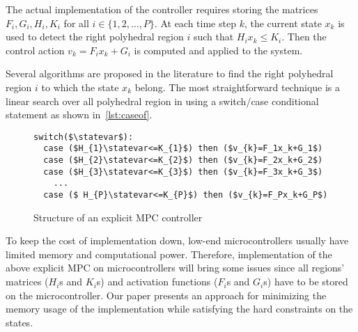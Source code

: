 The actual implementation of the controller requires storing the matrices $F_i,G_i,H_i,K_i$ for all $i\in\{1,2,\ldots,P\}$. At each time step $k$, the current state $x_k$ is used to detect the right polyhedral region $i$ such that $H_i x_k\le K_i$. Then the control action $v_k = F_i x_k + G_i$ is computed and applied to the system.

Several algorithms are proposed in the literature \cite{Mnnigmann:2011,Jones:2006} to find the right polyhedral region $i$ to which the state $x_k$ belong. The most straightforward technique is a linear search over all polyhedral region in \statespace\space using a switch/case conditional statement as shown in~\autoref{lst:caseof}.

\begin{figure}[t]
\begin{lstlisting}[mathescape=true,basicstyle=\small\ttfamily,morekeywords={switch, case, then}]
switch($\statevar$):
  case ($H_{1}\statevar<=K_{1}$) then ($v_{k}=F_1x_k+G_1$)
  case ($H_{2}\statevar<=K_{2}$) then ($v_{k}=F_2x_k+G_2$)
  case ($H_{3}\statevar<=K_{3}$) then ($v_{k}=F_3x_k+G_3$)
    ...
  case ($ H_{P}\statevar<=K_{P}$) then ($v_{k}=F_Px_k+G_P$)
\end{lstlisting}
\caption{Structure of an explicit MPC controller}
\label{lst:caseof}
\end{figure}

To keep the cost of implementation down, low-end microcontrollers usually have
limited memory and computational power. Therefore, implementation of the above
explicit MPC on microcontrollers will bring some issues since all regions'
matrices ($H_i$s and $K_i$s) and activation functions ($F_i$s and $G_i$s) have
to be stored on the microcontroller. Our paper presents an
approach for minimizing the memory usage of the implementation while satisfying
the hard constraints on the states.
